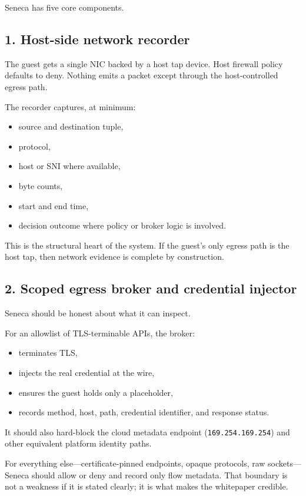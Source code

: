 \documentclass[11pt]{article}
\begin{document}
Seneca has five core components.

\subsection{1. Host-side network recorder}

The guest gets a single NIC backed by a host tap device. Host firewall policy defaults to deny. Nothing emits a packet except through the host-controlled egress path.

The recorder captures, at minimum:
\begin{itemize}[leftmargin=1.5em]
    \item source and destination tuple,
    \item protocol,
    \item host or SNI where available,
    \item byte counts,
    \item start and end time,
    \item decision outcome where policy or broker logic is involved.
\end{itemize}

This is the structural heart of the system. If the guest's only egress path is the host tap, then network evidence is complete by construction.

\subsection{2. Scoped egress broker and credential injector}

Seneca should be honest about what it can inspect.

For an allowlist of TLS-terminable APIs, the broker:
\begin{itemize}[leftmargin=1.5em]
    \item terminates TLS,
    \item injects the real credential at the wire,
    \item ensures the guest holds only a placeholder,
    \item records method, host, path, credential identifier, and response status.
\end{itemize}

It should also hard-block the cloud metadata endpoint (\texttt{169.254.169.254}) and other equivalent platform identity paths.

For everything else---certificate-pinned endpoints, opaque protocols, raw sockets---Seneca should allow or deny and record only flow metadata. That boundary is not a weakness if it is stated clearly; it is what makes the whitepaper credible.
\end{document}
